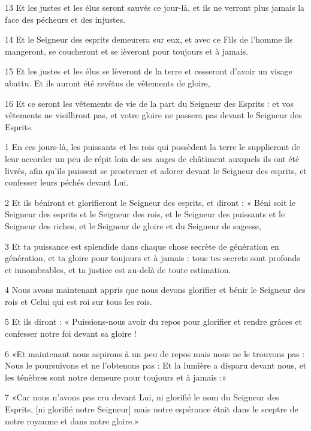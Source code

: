 \par 13 Et les justes et les élus seront sauvés ce jour-là, et ils ne verront plus jamais la face des pécheurs et des injustes.
\par 14 Et le Seigneur des esprits demeurera sur eux, et avec ce Fils de l'homme ils mangeront, se coucheront et se lèveront pour toujours et à jamais.
\par 15 Et les justes et les élus se lèveront de la terre et cesseront d'avoir un visage abattu. Et ils auront été revêtus de vêtements de gloire,
\par 16 Et ce seront les vêtements de vie de la part du Seigneur des Esprits : et vos vêtements ne vieilliront pas, et votre gloire ne passera pas devant le Seigneur des Esprits.


\par 1 En ces jours-là, les puissants et les rois qui possèdent la terre le supplieront de leur accorder un peu de répit loin de ses anges de châtiment auxquels ils ont été livrés, afin qu'ils puissent se prosterner et adorer devant le Seigneur des esprits, et confesser leurs péchés devant Lui.
\par 2 Et ils béniront et glorifieront le Seigneur des esprits, et diront : « Béni soit le Seigneur des esprits et le Seigneur des rois, et le Seigneur des puissants et le Seigneur des riches, et le Seigneur de gloire et du Seigneur de sagesse,
\par 3 Et ta puissance est splendide dans chaque chose secrète de génération en génération, et ta gloire pour toujours et à jamais : tous tes secrets sont profonds et innombrables, et ta justice est au-delà de toute estimation.
\par 4 Nous avons maintenant appris que nous devons glorifier et bénir le Seigneur des rois et Celui qui est roi sur tous les rois.
\par 5 Et ils diront : « Puissions-nous avoir du repos pour glorifier et rendre grâces et confesser notre foi devant sa gloire !
\par 6 «Et maintenant nous aspirons à un peu de repos mais nous ne le trouvons pas : Nous le poursuivons et ne l'obtenons pas : Et la lumière a disparu devant nous, et les ténèbres sont notre demeure pour toujours et à jamais :»
\par 7 «Car nous n'avons pas cru devant Lui, ni glorifié le nom du Seigneur des Esprits, [ni glorifié notre Seigneur] mais notre espérance était dans le sceptre de notre royaume et dans notre gloire.»
